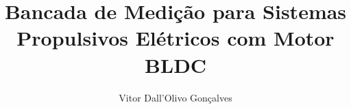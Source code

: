 \documentclass[aspectratio=169,11pt]{beamer}
\title{Bancada de Medição para Sistemas Propulsivos Elétricos com Motor BLDC}
\author{Vitor Dall'Olivo Gonçalves}
\begin{document}
\capaudesc








\fechamentoudesc
\end{document}
